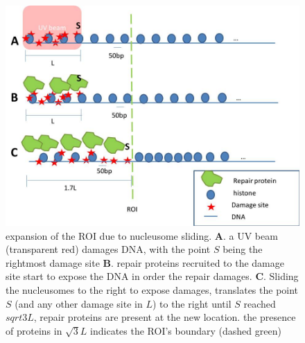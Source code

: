 \documentclass[12pt]{report}
\begin{document}
	
	\begin{figure}
	\centering
	\includegraphics[width=0.7\linewidth]{histoneSlidingMulti}
	\caption{expansion of the ROI due to nucleusome sliding. \textbf{A}. a UV beam (transparent red) damages DNA, with the point $S$ being the rightmost damage site \textbf{B}. repair proteins recruited to the damage site start to expose the DNA in order the repair damages. \textbf{C}. Sliding the nucleusomes to the right to expose damages, translates the point $S$ (and any other damage site in $L$) to the right until $S$ reached $sqrt{3}L$, repair proteins are present at the new location. the presence of proteins in $\sqrt{3}L$ indicates the ROI's boundary (dashed green)}
	\label{fig:histoneSlidingMulti}
	\end{figure}
	
	
\end{document}
